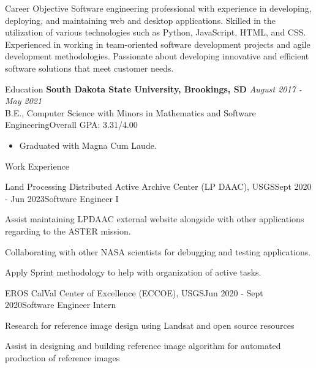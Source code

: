 \documentclass[11pt, a4paper]{resume}
\begin{document}
\begin{rSection}{Career Objective}
{\normalfont Software engineering professional with experience in developing, deploying, and maintaining web and desktop applications. Skilled in the utilization of various technologies such as Python, JavaScript, HTML, and CSS. Experienced in working in team-oriented software development projects and agile development methodologies. Passionate about developing innovative and efficient software solutions that meet customer needs.}
\end{rSection}

\begin{rSection}{Education}
{\bf South Dakota State University, Brookings, SD} \hfill {\normalfont \em August 2017 - May 2021} 
\\ {\normalfont B.E., Computer Science with Minors in Mathematics and Software Engineering}\hfill {\normalfont Overall GPA: 3.31/4.00 }
    \begin{itemize}
        \item \normalfont Graduated with Magna Cum Laude.
    \end{itemize}
\end{rSection}

\begin{rSection}{Work Experience}
\begin{rSubsection}{Land Processing Distributed Active Archive Center (LP DAAC), USGS}{\normalfont Sept 2020 - Jun 2023}{Software Engineer I}{}
 \item {\normalfont Assist maintaining LPDAAC external website alongside with other applications regarding to the ASTER mission.}
 \item {\normalfont Collaborating with other NASA scientists for debugging and testing applications.}
 \item {\normalfont Apply Sprint methodology to help with organization of active tasks.}
\end{rSubsection}
\begin{rSubsection}{EROS CalVal Center of Excellence (ECCOE), USGS}{\normalfont Jun 2020 - Sept 2020}{Software Engineer Intern}{}
 \item {\normalfont Research for reference image design using Landsat and open source resources}
 \item {\normalfont Assist in designing and building reference image algorithm for automated production of reference images}
\end{rSubsection}

\end{rSection}
\end{document}

